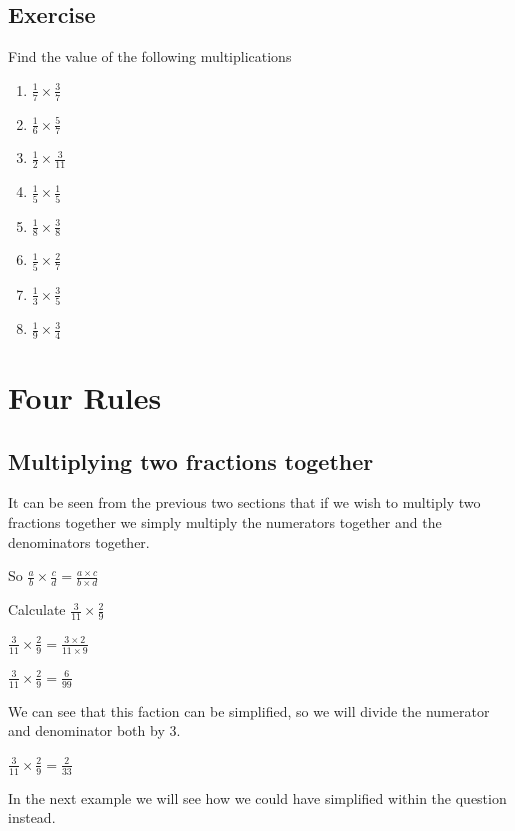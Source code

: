 \subsection{Exercise}
Find the value of the following multiplications
\begin{enumerate}
	\item $\frac{1}{7} \times \frac{3}{7}$
	\item $\frac{1}{6} \times \frac{5}{7}$
	\item $\frac{1}{2} \times \frac{3}{11}$
	\item $\frac{1}{5} \times \frac{1}{5}$
	\item $\frac{1}{8} \times \frac{3}{8}$
	\item $\frac{1}{5} \times \frac{2}{7}$
	\item $\frac{1}{3} \times \frac{3}{5}$
	\item $\frac{1}{9} \times \frac{3}{4}$
\end{enumerate}

\section{Four Rules}
\subsection{Multiplying two fractions together}
It can be seen from the previous two sections that if we wish to multiply two fractions together we simply multiply the numerators together and the denominators together.

So $\displaystyle \frac{a}{b} \times \frac{c}{d} = \frac{a \times c}{b \times d}$

\begin{exmp}
Calculate $\displaystyle \frac{3}{11} \times \frac{2}{9}$

\bigskip

$\displaystyle \frac{3}{11} \times \frac{2}{9} = \frac{3 \times 2}{11 \times 9}$

\bigskip

$\displaystyle \frac{3}{11} \times \frac{2}{9} = \frac{6}{99}$

\bigskip

\noindent We can see that this faction can be simplified, so we will divide the numerator and denominator both by 3.

\bigskip

$\displaystyle \frac{3}{11} \times \frac{2}{9} = \frac{2}{33}$

\bigskip

\noindent In the next example we will see how we could have simplified within the question instead.
\end{exmp}

